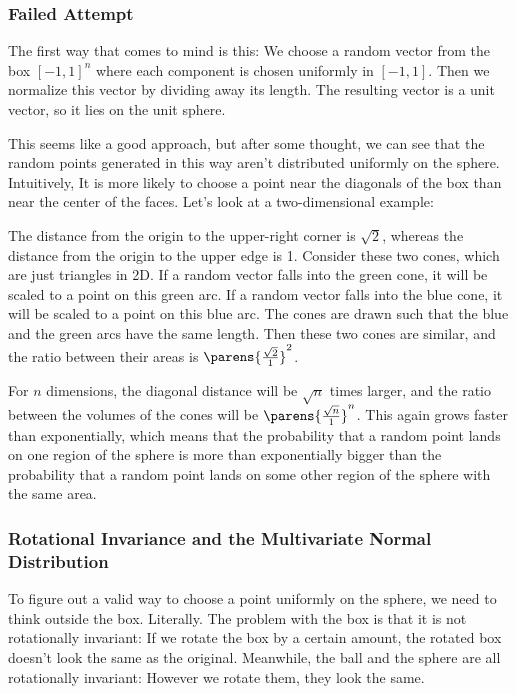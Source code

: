 \documentclass{article}
\begin{document}
\subsubsection{Failed Attempt}

The first way that comes to mind is this: We choose a random vector from the box $[-1, 1]^n$ where each component is chosen uniformly in $[-1, 1]$. Then we normalize this vector by dividing away its length. The resulting vector is a unit vector, so it lies on the unit sphere.

This seems like a good approach, but after some thought, we can see that the random points generated in this way aren't distributed uniformly on the sphere. Intuitively, It is more likely to choose a point near the diagonals of the box than near the center of the faces. Let's look at a two-dimensional example:


The distance from the origin to the upper-right corner is $\sqrt{2}$, whereas the distance from the origin to the upper edge is 1. Consider these two cones, which are just triangles in 2D. If a random vector falls into the green cone, it will be scaled to a point on this green arc. If a random vector falls into the blue cone, it will be scaled to a point on this blue arc. The cones are drawn such that the blue and the green arcs have the same length. Then these two cones are similar, and the ratio between their areas is $\parens{\frac{\sqrt{2}}{1}}^2$.

For $n$ dimensions, the diagonal distance will be $\sqrt{n}$ times larger, and the ratio between the volumes of the cones will be $\parens{\frac{\sqrt{n}}{1}}^n$. This again grows faster than exponentially, which means that the probability that a random point lands on one region of the sphere is more than exponentially bigger than the probability that a random point lands on some other region of the sphere with the same area.

\subsubsection{Rotational Invariance and the Multivariate Normal Distribution}

To figure out a valid way to choose a point uniformly on the sphere, we need to think outside the box. Literally. The problem with the box is that it is not rotationally invariant: If we rotate the box by a certain amount, the rotated box doesn't look the same as the original. Meanwhile, the ball and the sphere are all rotationally invariant: However we rotate them, they look the same.
\end{document}

